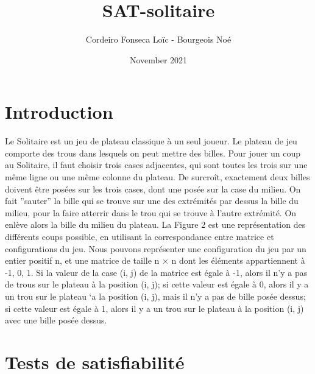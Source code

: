 \documentclass[utf8]{article}
\title{SAT-solitaire}
\author{Cordeiro Fonseca Loïc - Bourgeois Noé}
\date{November 2021}
\begin{document}
\maketitle
\tableofcontents

\newpage


\section{Introduction}
Le Solitaire est un jeu de plateau classique à un seul joueur.
Le plateau de jeu comporte des trous dans lesquels on peut mettre des billes.
Pour jouer un coup au Solitaire, il faut choisir trois cases adjacentes, qui sont
toutes les trois sur une même ligne ou une même colonne du plateau. De surcroît,
exactement deux billes doivent être posées sur les trois cases, dont une posée sur
la case du milieu. On fait ”sauter” la bille qui se trouve sur une des extrémités
par dessus la bille du milieu, pour la faire atterrir dans le trou qui se trouve à
l’autre extrémité. On enlève alors la bille du milieu du plateau. La Figure 2 est
une représentation des différents coups possible, en utilisant la correspondance
entre matrice et configurations du jeu. Nous pouvons représenter une configuration du jeu par un entier positif n, et
une matrice de taille n × n dont les éléments appartiennent à {-1, 0, 1}. Si la
valeur de la case (i, j) de la matrice est égale à -1, alors il n’y a pas de trous
sur le plateau à la position (i, j); si cette valeur est égale à 0, alors il y a un
trou sur le plateau `a la position (i, j), mais il n’y a pas de bille posée dessus;
si cette valeur est égale à 1, alors il y a un trou sur le plateau à la position (i, j) avec une bille posée dessus.

\section{Tests de satisfiabilité}
\end{document}
